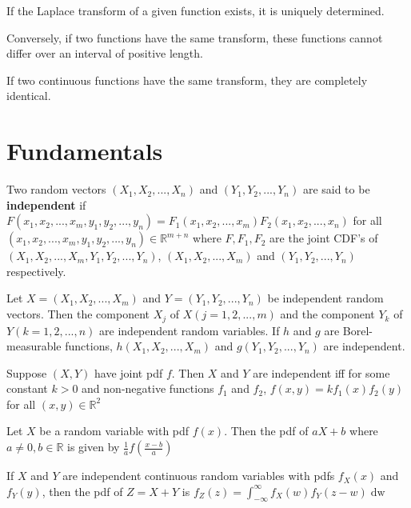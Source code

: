 \begin{thm}
    If the Laplace transform of a given function exists, it is uniquely determined.
    
    Conversely, if two functions have the same transform, these functions cannot differ over an interval of positive length.

    If two continuous functions have the same transform, they are completely identical.
\end{thm}

\hhrule
\section*{Fundamentals}

\begin{defn}
    Two random vectors $(X_1, X_2, ... , X_n)$ and $(Y_1, Y_2, ... , Y_n)$ are said to be \textbf{independent} if $F(x_1, x_2, ..., x_m, y_1, y_2, ..., y_n) = F_1 (x_1, x_2, ..., x_m) F_2 (x_1, x_2, ..., x_n)$ for all $(x_1, x_2, ..., x_m, y_1, y_2, ..., y_n) \in \mathbb{R}^{m+n}$ where $F, F_1, F_2$ are the joint CDF's of $(X_1, X_2, ..., X_m, Y_1, Y_2, ..., Y_n)$, $(X_1, X_2, ..., X_m)$ and $(Y_1, Y_2, ..., Y_n)$ respectively.
\end{defn}

\begin{thm}
    Let $X = (X_1, X_2, ... , X_m)$ and $Y = (Y_1, Y_2, ... , Y_n)$ be independent random vectors. Then the component $X_j$ of $X(j = 1, 2, ... , m)$ and the component $Y_k$ of $Y(k = 1, 2, ... , n)$ are independent random variables. If $h$ and $g$ are Borel-measurable functions, $h(X_1, X_2, ..., X_m)$ and $g(Y_1, Y_2, ... , Y_n)$ are independent.
\end{thm}

\begin{thm}
    Suppose $(X,Y)$ have joint pdf $f$. Then $X$ and $Y$ are independent iff for some constant $k > 0$ and non-negative functions $f_1$ and $f_2$, $f(x,y) = k f_1(x)f_2(y)$ for all $(x,y) \in \mathbb{R}^2$
\end{thm}

\begin{thm}
    Let $X$ be a random variable with pdf $f(x)$. Then the pdf of $aX+b$ where $a \neq 0, b \in \mathbb{R}$ is given by $\displaystyle \frac{1}{a} f \left (\frac{x-b}{a} \right)$
\end{thm}

\begin{thm}
    If $X$ and $Y$ are independent continuous random variables with pdfs $f_X(x)$ and $f_Y(y)$, then the pdf of $Z = X+Y$ is $f_Z\left (z\right ) = \displaystyle\int_{- \infty}^\infty f_X \left (w\right ) f_Y \left (z - w\right ) \mathop{\mathrm{d} w}$
\end{thm}

